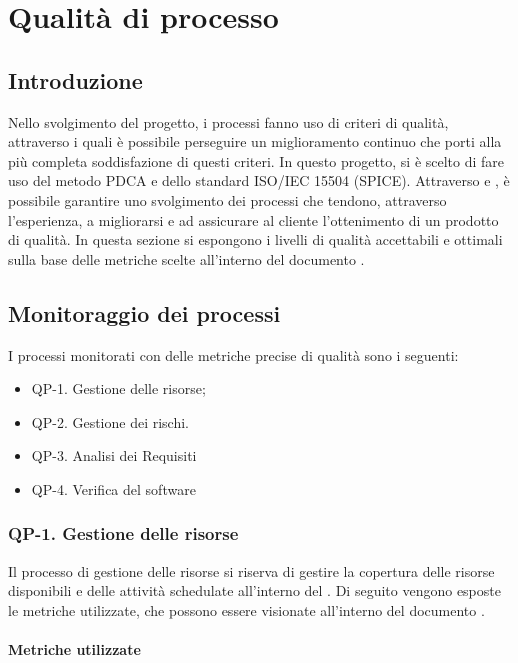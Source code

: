 \section{Qualità di processo}

\subsection{Introduzione}

Nello svolgimento del progetto, i processi fanno uso di criteri di qualità, attraverso i quali è possibile perseguire un miglioramento continuo che porti alla più completa soddisfazione di questi criteri. In questo progetto, si è scelto di fare uso del metodo PDCA e dello standard ISO/IEC 15504 (SPICE). Attraverso  e , è possibile garantire uno svolgimento dei processi che tendono, attraverso l'esperienza, a migliorarsi e ad assicurare al cliente l'ottenimento di un prodotto di qualità.
In questa sezione si espongono i livelli di qualità accettabili e ottimali sulla base delle metriche scelte all'interno del documento .

\subsection{Monitoraggio dei processi}

I processi monitorati con delle metriche precise di qualità sono i seguenti:

\begin{itemize}
	\item QP-1. Gestione delle risorse;
	\item QP-2. Gestione dei rischi.
 	\item QP-3. Analisi dei Requisiti
	\item QP-4. Verifica del software
\end{itemize}

	\subsubsection{QP-1. Gestione delle risorse}

		Il processo di gestione delle risorse si riserva di gestire la copertura delle risorse disponibili e delle attività schedulate all'interno del . Di seguito vengono esposte le metriche utilizzate, che possono essere visionate all'interno del documento .

		\paragraph{Metriche utilizzate}

